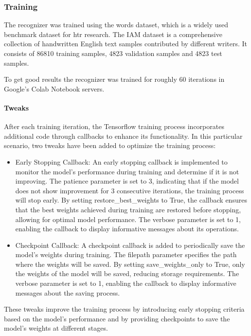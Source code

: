 \subsubsection{Training}
The recognizer was trained using the \textit{\cite{IAM}} words dataset, which is a widely used benchmark dataset for \gls{htr} research. The IAM dataset is a comprehensive collection of handwritten English text samples contributed by different writers. It consists of 86810 training samples, 4823 validation samples and 
4823 test samples.

To get good results the recognizer was trained for roughly 60 iterations in Google's Colab Notebook servers.

\paragraph{Tweaks}
After each training iteration, the Tensorflow training process incorporates additional code through callbacks to enhance its functionality. In this particular scenario, two tweaks have been added to optimize the training process:
\begin{itemize}
    \item Early Stopping Callback:
    An early stopping callback is implemented to monitor the model's performance during training and determine if it is not improving.
    The patience parameter is set to 3, indicating that if the model does not show improvement for 3 consecutive iterations, the training process will stop early.
    By setting restore\_best\_weights to True, the callback ensures that the best weights achieved during training are restored before stopping, allowing for optimal model performance.
    The verbose parameter is set to 1, enabling the callback to display informative messages about its operations. 
    \item Checkpoint Callback:
    A checkpoint callback is added to periodically save the model's weights during training.
    The filepath parameter specifies the path where the weights will be saved.
    By setting save\_weights\_only to True, only the weights of the model will be saved, reducing storage requirements.
    The verbose parameter is set to 1, enabling the callback to display informative messages about the saving process.
\end{itemize}

These tweaks improve the training process by introducing early stopping criteria based on the model's performance and by providing checkpoints to save the model's weights at different stages.


